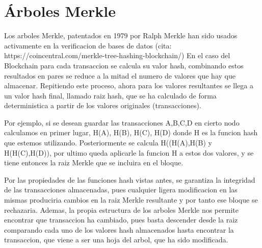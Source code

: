 \section{Árboles Merkle}\label{merkle}
Los arboles Merkle, patentados en 1979 por Ralph Merkle han sido usados activamente en la verificacion de bases de datos (cita: https://coincentral.com/merkle-tree-hashing-blockchain/)
En el caso del Blockchain para cada transaccion se calcula su valor hash, combinando estos resultados en pares se reduce a la mitad el numero de valores que hay que almacenar. Repitiendo este proceso, ahora para los valores resultantes se llega a un valor hash final, llamado raiz hash, que se ha calculado de forma deterministica a partir de los valores originales (transacciones).

Por ejemplo, si se desean guardar las transacciones A,B,C,D en cierto nodo calculamos en primer lugar, H(A), H(B), H(C), H(D) donde H es la funcion hash que estemos utilizando. Posteriormente se calcula H((H(A),H(B) y H(H(C),H(D)), por ultimo queda aplicarle la funcion H a estos dos valores, y se tiene entonces la raiz Merkle que se incluira en el bloque.

Por las propiedades de las funciones hash vistas antes, se garantiza la integridad de las transacciones almacenadas, pues cualquier ligera modificacion en las mismas produciria cambios en la raiz Merkle resultante y por tanto ese bloque se rechazaria. Ademas, la propia estructura de los arboles Merkle nos permite encontrar que transaccion ha cambiado, pues basta descender desde la raiz comparando cada uno de los valores hash almacenados hasta encontrar la transaccion, que viene a ser una hoja del arbol, que ha sido modificada.

\begin{figure}[H]
\centering
  \qquad

	\label{fig:merkle}%
\end{figure}


